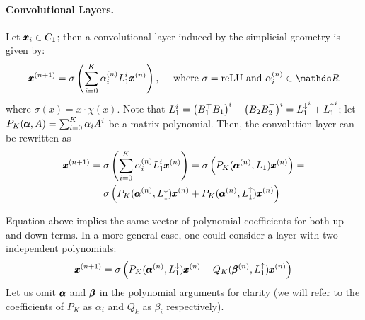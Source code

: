 \documentclass{mynotes}
\begin{document}
\paragraph{ Convolutional Layers. }

Let \( \pmb{x}_i \in C_1 \); then a convolutional layer induced by the simplicial geometry is given by:
\begin{equation*}
      \b x^{(n+1)} = \sigma \left( \sum_{i=0}^K \alpha_i^{(n)} L_1^i \b x^{(n)} \right), \quad \text{ where } \sigma=\mathrm{reLU} \text{ and } \alpha_i^{(n)} \in \ds R
\end{equation*}
where \(\sigma ( x ) = x \cdot \chi(x) \). Note that \( L_1^i = \left( B_1^\top B_1 \right)^i + \left( B_2 B_2^\top \right)^i = {L_{1}^{\downarrow}}^i + {L_{1}^{\uparrow}}^i \); let \( P_K( \pmb{\alpha}, A ) = \sum_{i=0}^K \alpha_i A^i \) be a matrix polynomial. Then, the convolution layer can be rewritten as
\begin{equation}
      \begin{aligned}
            \pmb{x}^{(n+1)} & = \sigma \left( \sum_{i=0}^K \alpha_i^{(n)} L_1^i \pmb{x}^{(n)} \right) = \sigma \left( P_K( \pmb{\alpha}^{(n)}, L_1) \pmb{x}^{(n)} \right) = \\
            & = \sigma \left( P_K( \pmb{\alpha}^{(n)}, L_{1}^{\downarrow}) \pmb{x}^{(n)} + P_K( \pmb{\alpha}^{(n)}, L_{1}^{\uparrow}) \pmb{x}^{(n)}  \right) 
      \end{aligned}
\end{equation}

Equation above implies the same vector of polynomial coefficients for both up- and down-terms. In a more general case, one could consider a layer with two independent polynomials:
\begin{equation}
      \pmb{x}^{(n+1)} = \sigma \left( P_K( \pmb{\alpha}^{(n)}, L_{1}^{\downarrow}) \pmb{x}^{(n)} + Q_K( \pmb{\beta}^{(n)}, L_{1}^{\uparrow}) \pmb{x}^{(n)}  \right) 
\end{equation}
Let us omit \( \pmb{\alpha} \) and \( \pmb{\beta} \) in the polynomial arguments for clarity (we will refer to the coefficients of \( P_K \) as \( \alpha_i \) and \( Q_k \) as \( \beta_i \) respectively).
\end{document}
